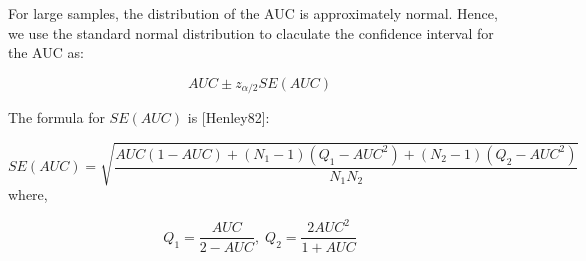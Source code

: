 \documentclass[10pt,journal,compsoc]{IEEEtran}
\begin{document}
For large samples, the distribution of the AUC is approximately normal. Hence, we use the standard normal distribution to claculate the confidence interval for the AUC as:

\begin{equation}
    AUC \pm z_{\alpha/2}SE(AUC)
\end{equation}

The formula for $SE(AUC)$ is [Henley82]:

\begin{equation}
    SE(AUC) = \sqrt{\frac{AUC(1-AUC) + (N_1-1)(Q_1-AUC^2) + (N_2-1)(Q_2-AUC^2)}{N_1N_2}}
\end{equation}
where,

\begin{equation}
    Q_1 = \frac{AUC}{2-AUC}, \;
    Q_2 = \frac{2AUC^2}{1+AUC}
\end{equation}
\end{document}
